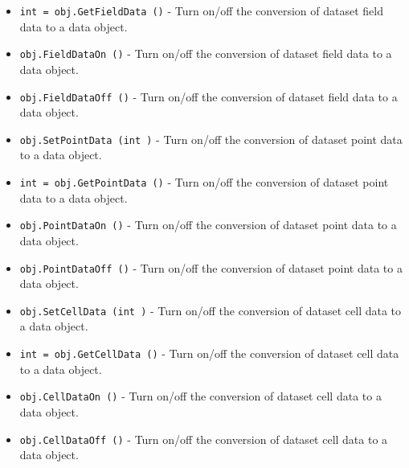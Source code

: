 \begin{itemize}
\item  \verb|int = obj.GetFieldData ()| -  Turn on/off the conversion of dataset field data to a data object.

\item  \verb|obj.FieldDataOn ()| -  Turn on/off the conversion of dataset field data to a data object.

\item  \verb|obj.FieldDataOff ()| -  Turn on/off the conversion of dataset field data to a data object.

\item  \verb|obj.SetPointData (int )| -  Turn on/off the conversion of dataset point data to a data object.

\item  \verb|int = obj.GetPointData ()| -  Turn on/off the conversion of dataset point data to a data object.

\item  \verb|obj.PointDataOn ()| -  Turn on/off the conversion of dataset point data to a data object.

\item  \verb|obj.PointDataOff ()| -  Turn on/off the conversion of dataset point data to a data object.

\item  \verb|obj.SetCellData (int )| -  Turn on/off the conversion of dataset cell data to a data object.

\item  \verb|int = obj.GetCellData ()| -  Turn on/off the conversion of dataset cell data to a data object.

\item  \verb|obj.CellDataOn ()| -  Turn on/off the conversion of dataset cell data to a data object.

\item  \verb|obj.CellDataOff ()| -  Turn on/off the conversion of dataset cell data to a data object.

\end{itemize}
